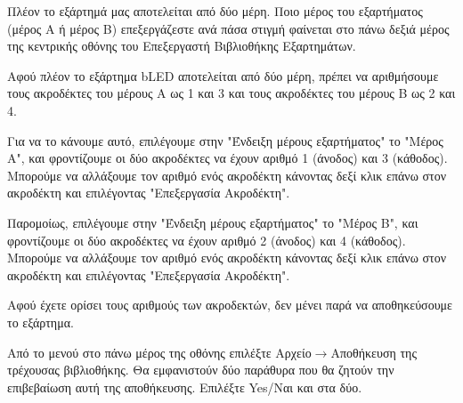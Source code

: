 \documentclass[a4paper]{article}
\begin{document}
Πλέον το εξάρτημά μας αποτελείται από δύο μέρη. Ποιο μέρος του εξαρτήματος (μέρος Α ή μέρος Β) επεξεργάζεστε ανά πάσα στιγμή φαίνεται στο πάνω δεξιά μέρος της κεντρικής οθόνης του Επεξεργαστή Βιβλιοθήκης Εξαρτημάτων.

\begin{figure}
  \begin{center}
    \label{fig:kicad-main}
  \end{center}
\end{figure}

Αφού πλέον το εξάρτημα bLED αποτελείται από δύο μέρη, πρέπει να αριθμήσουμε τους ακροδέκτες του μέρους Α ως 1 και 3 και τους ακροδέκτες του μέρους Β ως 2 και 4.

Για να το κάνουμε αυτό, επιλέγουμε στην "Ένδειξη μέρους εξαρτήματος" το "Μέρος A", και φροντίζουμε οι δύο ακροδέκτες να έχουν αριθμό 1 (άνοδος) και 3 (κάθοδος). Μπορούμε να αλλάξουμε τον αριθμό ενός ακροδέκτη κάνοντας δεξί κλικ επάνω στον ακροδέκτη και επιλέγοντας "Επεξεργασία Ακροδέκτη".

Παρομοίως, επιλέγουμε στην "Ένδειξη μέρους εξαρτήματος" το "Μέρος B", και φροντίζουμε οι δύο ακροδέκτες να έχουν αριθμό 2 (άνοδος) και 4 (κάθοδος). Μπορούμε να αλλάξουμε τον αριθμό ενός ακροδέκτη κάνοντας δεξί κλικ επάνω στον ακροδέκτη και επιλέγοντας "Επεξεργασία Ακροδέκτη".

\begin{figure}
  \begin{center}
    \label{fig:kicad-main}
  \end{center}
\end{figure}

\begin{figure}
  \begin{center}
    \label{fig:kicad-main}
  \end{center}
\end{figure}

Αφού έχετε ορίσει τους αριθμούς των ακροδεκτών, δεν μένει παρά να αποθηκεύσουμε το εξάρτημα.

Από το μενού στο πάνω μέρος της οθόνης επιλέξτε Αρχείο$\rightarrow$Αποθήκευση της τρέχουσας βιβλιοθήκης. Θα εμφανιστούν δύο παράθυρα που θα ζητούν την επιβεβαίωση αυτή της αποθήκευσης. Επιλέξτε Yes/Ναι και στα δύο.
\end{document}
